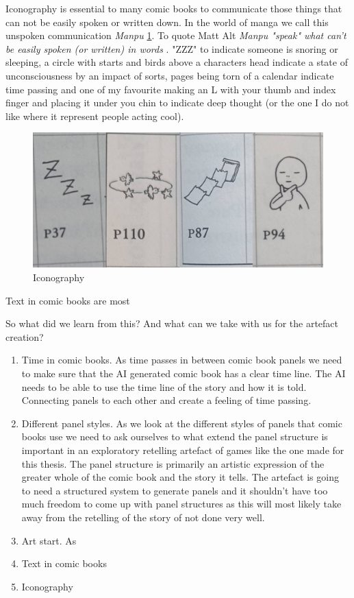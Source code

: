 Iconography is essential to many comic books to communicate those things that can not be easily spoken or written down. In the world of manga we call this unspoken communication \textit{Manpu} \ref{fig:Iconography}. To quote Matt Alt \textit{ Manpu "speak" what can't be easily spoken (or written) in words} \cite{GigaTown}. "ZZZ" to indicate someone is snoring or sleeping, a circle with starts and birds above a characters head indicate a state of unconsciousness by an impact of sorts, pages being torn of a calendar indicate time passing and one of my favourite making an L with your thumb and index finger and placing it under you chin to indicate deep thought (or the one I do not like where it represent people acting cool). 

\begin{figure}[!htp]
	\centering
	\includegraphics[scale=0.45]{images/IconographyGigaTown.png}
	\caption[Iconography]{Iconography \cite{GigaTown}}
	\label{fig:Iconography}
\end{figure}

Text in comic books are most 


So what did we learn from this? And what can we take with us for the artefact creation?
\begin{enumerate}
    \item Time in comic books. As time passes in between comic book panels we need to make sure that the AI generated comic book has a clear time line. The AI needs to be able to use the time line of the story and how it is told. Connecting panels to each other and create a feeling of time passing.
    \item Different panel styles. As we look at the different styles of panels that comic books use we need to ask ourselves to what extend the panel structure is important in an exploratory retelling artefact of games like the one made for this thesis. The panel structure is primarily an artistic expression of the greater whole of the comic book and the story it tells. The artefact is going to need a structured system to generate panels and it shouldn't have too much freedom to come up with panel structures as this will most likely take away from the retelling of the story of not done very well.
    \item Art start. As 
    \item Text in comic books
    \item Iconography
\end{enumerate}



